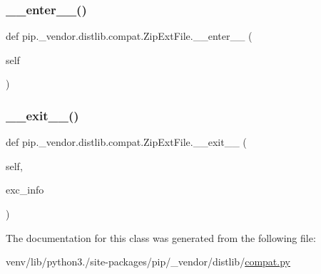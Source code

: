 \subsubsection{\texorpdfstring{\+\_\+\+\_\+enter\+\_\+\+\_\+()}{\_\_enter\_\_()}}
{\footnotesize\ttfamily def pip.\+\_\+vendor.\+distlib.\+compat.\+Zip\+Ext\+File.\+\_\+\+\_\+enter\+\_\+\+\_\+ (\begin{DoxyParamCaption}\item[{}]{self }\end{DoxyParamCaption})}

\mbox{\label{classpip_1_1__vendor_1_1distlib_1_1compat_1_1ZipExtFile_a21050c46f5a55b4729b228efca50bb5f}} 
\subsubsection{\texorpdfstring{\+\_\+\+\_\+exit\+\_\+\+\_\+()}{\_\_exit\_\_()}}
{\footnotesize\ttfamily def pip.\+\_\+vendor.\+distlib.\+compat.\+Zip\+Ext\+File.\+\_\+\+\_\+exit\+\_\+\+\_\+ (\begin{DoxyParamCaption}\item[{}]{self,  }\item[{}]{exc\+\_\+info }\end{DoxyParamCaption})}



The documentation for this class was generated from the following file\+:\begin{DoxyCompactItemize}
\item 
venv/lib/python3./site-\/packages/pip/\+\_\+vendor/distlib/\hyperlink{__vendor_2distlib_2compat_8py}{compat.\+py}\end{DoxyCompactItemize}
